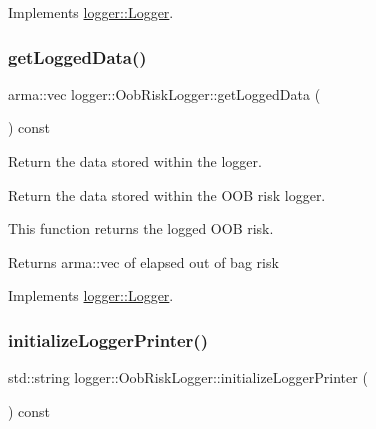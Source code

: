 Implements \mbox{\hyperlink{classlogger_1_1_logger_a8c68db2430fa84b67528bfa6ae45a516}{logger\+::\+Logger}}.

\mbox{\label{classlogger_1_1_oob_risk_logger_a74bfab14d3da0b10229c1ae99ab11337}} 
\subsubsection{\texorpdfstring{get\+Logged\+Data()}{getLoggedData()}}
{\footnotesize\ttfamily arma\+::vec logger\+::\+Oob\+Risk\+Logger\+::get\+Logged\+Data (\begin{DoxyParamCaption}{ }\end{DoxyParamCaption}) const\hspace{0.3cm}{\ttfamily [virtual]}}



Return the data stored within the logger. 

Return the data stored within the O\+OB risk logger.

This function returns the logged O\+OB risk.

\begin{DoxyReturn}{Returns}
{\ttfamily arma\+::vec} of elapsed out of bag risk 
\end{DoxyReturn}


Implements \mbox{\hyperlink{classlogger_1_1_logger_aa4fc254c532172db3404b7c0bcd17092}{logger\+::\+Logger}}.

\mbox{\label{classlogger_1_1_oob_risk_logger_afb230d22eea9b1c025e6ff95685c692c}} 
\subsubsection{\texorpdfstring{initialize\+Logger\+Printer()}{initializeLoggerPrinter()}}
{\footnotesize\ttfamily std\+::string logger\+::\+Oob\+Risk\+Logger\+::initialize\+Logger\+Printer (\begin{DoxyParamCaption}{ }\end{DoxyParamCaption}) const\hspace{0.3cm}{\ttfamily [virtual]}}



